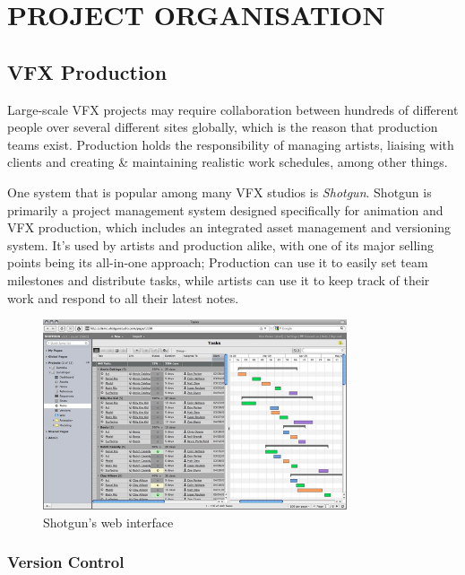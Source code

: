 \pagebreak\hypertarget{project-organisation}{%
\section{PROJECT ORGANISATION}\label{project-organisation}}

\hypertarget{vfx-production}{%
\subsection{VFX Production}\label{vfx-production}}

Large-scale VFX projects may require collaboration between hundreds of different people over several different sites globally, which is the reason that production teams exist. Production holds the responsibility of managing artists, liaising with clients and creating \& maintaining realistic work schedules, among other things.

One system that is popular among many VFX studios is \emph{Shotgun}. Shotgun is primarily a project management system designed specifically for animation and VFX production, which includes an integrated asset management and versioning system. It's used by artists and production alike, with one of its major selling points being its all-in-one approach; Production can use it to easily set team milestones and distribute tasks, while artists can use it to keep track of their work and respond to all their latest notes.

\begin{figure}
\includegraphics[width=0.8\textwidth,height=\textheight]{./images/shotgun_task_view.png}
\caption{Shotgun's web interface}
\end{figure}

\hypertarget{version-control}{%
\subsubsection{Version Control}\label{version-control}}


